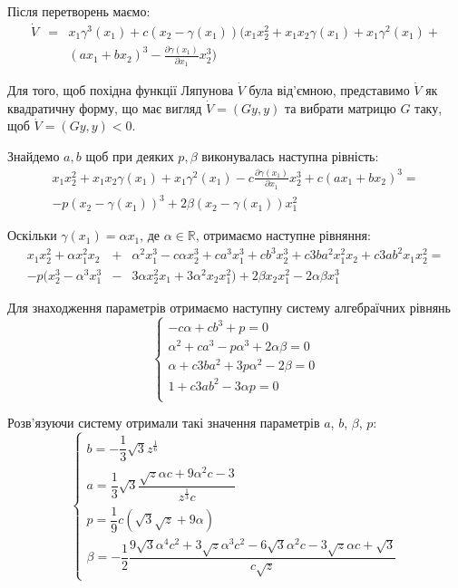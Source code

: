 \documentclass{article}
\begin{document}
Після перетворень маємо:
\begin{eqnarray}
    \dot V&=& x_1\gamma^3(x_1)+c(x_2 - \gamma(x_1))
   \Big (x_1x_2^2 + x_1x_2\gamma(x_1) + x_{1}\gamma^2(x_1) +\nonumber\\ 
    &&(ax_1+bx_2)^3 - \frac{\partial \gamma(x_1)}{\partial x_1}x_{2}^3\Big)
\end{eqnarray}

Для того, щоб похідна функції Ляпунова $\dot V$ була від'ємною, представимо
 $\dot V$ як квадратичну форму, що має вигляд $\dot V =(Gy,y)$ 
та вибрати матрицю $G$ таку, щоб  $\dot V =(Gy,y) < 0$.

Знайдемо $a,b$ щоб при деяких $p, \beta$ виконувалась наступна рівність:
\begin{eqnarray}
    x_1x_2^2+x_1x_2\gamma(x_1) + x_1 \gamma^2(x_1) - 
    c\frac{\partial \gamma(x_1)}{\partial x_1}x_2^3 + c(ax_1+bx_2)^3 = \nonumber\\
    -p(x_2-\gamma(x_1))^3 +2\beta(x_2-\gamma(x_1))x_{1}^2 
\end{eqnarray}

Оскільки $\gamma(x_1)=\alpha x_1$, де $\alpha \in \mathbb{R}$,
отримаємо наступне рівняння:
\begin{eqnarray}
x_1x_{2}^2 + \alpha x_{1}^2x_2 &+& \alpha^2x_{1}^3 -c\alpha x_{2}^3 
+ ca^3x_{1}^3 +c b^3x_{2}^3 + c3ba^2x_{1}^2x_2+\nonumber
c3ab^2x_1x_{2}^2 =\\
-p(x_2^3 - \alpha^{3}x_{1}^3 &-& 3\alpha x_2^2x_{1} + 3\alpha^2x_2x_{1}^2)+
2\beta x_2x_{1}^2 - 2\alpha \beta x_1^3
\end{eqnarray}

Для знаходження параметрів отримаємо наступну систему алгебраїчних рівнянь 
\begin{equation}
    \begin{cases}
        -c\alpha+cb^3+p=0\\
        \alpha^2+ca^3-p\alpha^3+2\alpha\beta=0\\
        \alpha+c3ba^2+3p\alpha^2-2\beta=0\\
        1+c3ab^2-3\alpha p=0\\
    \end{cases}
\end{equation}

Розв'язуючи  систему отримали такі значення параметрів $a$, $b$, $\beta$, $p$: 
\begin{equation} \label{eqsystem}
    \begin{cases}
        b = -\dfrac{1}{3}\sqrt{3}
            z^{\frac{1}{6}}\\
        a=  \dfrac{1}{3}\sqrt{3}\dfrac{ \sqrt{z} \alpha c+9\alpha^2 c-3}
        {z^{\frac{1}{3}}c}\\
        p= \dfrac{1}{9}c(\sqrt{3}\sqrt{z}+9\alpha)\\
        \beta = -\dfrac{1}{2} 
        \dfrac{9\sqrt{3}\alpha^4c^2+3\sqrt{z}\alpha^3c^2
        -6\sqrt{3}\alpha^{2}c - 3\sqrt{z}\alpha c +\sqrt{3}
        }{c\sqrt{z}}
    \end{cases}
\end{equation}
\end{document}

